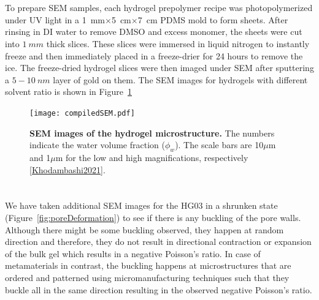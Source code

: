 \section{}
To prepare SEM samples, each hydrogel prepolymer recipe was photopolymerized under UV light in a 1~mm$\times$5~cm$\times$7~cm PDMS mold to form sheets. After rinsing in DI water to remove DMSO and excess monomer, the sheets were cut into $1~mm$ thick slices. These slices were immersed in liquid nitrogen to instantly freeze and then immediately placed in a freeze-drier for 24 hours to remove the ice. The freeze-dried hydrogel slices were then imaged under SEM after sputtering a $5-10~nm$ layer of gold on them. The SEM images for hydrogels with different solvent ratio is shown in Figure~\ref{fig:compiledSEM}

\begin{figure}[!th]
      \centering
      \texttt{[image: compiledSEM.pdf]}
      \caption[]{\textbf{SEM images of the hydrogel microstructure.} The numbers indicate the water volume fraction ($\phi_w$). The scale bars are 10$\mu$m and 1$\mu$m for the low and high magnifications, respectively \ref{Khodambashi2021}.}
      \label{fig:compiledSEM}
\end{figure}

\section{}
We have taken additional SEM images for the HG03 in a shrunken state (Figure~\ref{fig:poreDeformation}) to see if there is any buckling of the pore walls. Although there might be some buckling observed, they happen at random direction and therefore, they do not result in directional contraction or expansion of the bulk gel which results in a negative Poisson’s ratio. In case of metamaterials in contrast, the buckling happens at microstructures that are ordered and patterned using micromanufacturing techniques such that they buckle all in the same direction resulting in the observed negative Poisson’s ratio.

